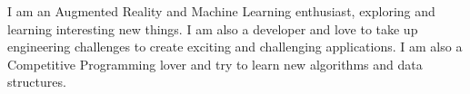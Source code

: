 


\begin{cvparagraph}

I am an Augmented Reality and Machine Learning enthusiast, exploring and learning interesting new things.
I am also a developer and love to take up engineering challenges to create exciting and challenging applications.
I am also a Competitive Programming lover and try to learn new algorithms and data structures.

\end{cvparagraph}
